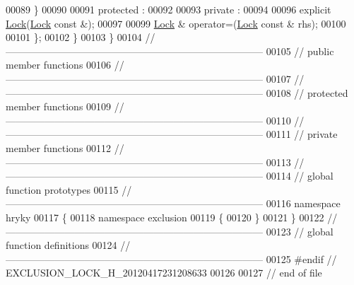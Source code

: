 \begin{DoxyCode}
00089     \}
00090 
00091 \textcolor{keyword}{protected} :
00092 
00093 \textcolor{keyword}{private} :
00094 
00096     \textcolor{keyword}{explicit} \hyperlink{classhryky_1_1exclusion_1_1_lock_a742be489a570c6005ea504e815433a97}{Lock}(\hyperlink{classhryky_1_1exclusion_1_1_lock}{Lock} \textcolor{keyword}{const} &);
00097 
00099     \hyperlink{classhryky_1_1exclusion_1_1_lock}{Lock} & operator=(\hyperlink{classhryky_1_1exclusion_1_1_lock}{Lock} \textcolor{keyword}{const} & rhs);
00100 
00101 \};
00102 \}
00103 \}
00104 \textcolor{comment}{//
      ------------------------------------------------------------------------------}
00105 \textcolor{comment}{// public member functions}
00106 \textcolor{comment}{//
      ------------------------------------------------------------------------------}
00107 \textcolor{comment}{//
      ------------------------------------------------------------------------------}
00108 \textcolor{comment}{// protected member functions}
00109 \textcolor{comment}{//
      ------------------------------------------------------------------------------}
00110 \textcolor{comment}{//
      ------------------------------------------------------------------------------}
00111 \textcolor{comment}{// private member functions}
00112 \textcolor{comment}{//
      ------------------------------------------------------------------------------}
00113 \textcolor{comment}{//
      ------------------------------------------------------------------------------}
00114 \textcolor{comment}{// global function prototypes}
00115 \textcolor{comment}{//
      ------------------------------------------------------------------------------}
00116 \textcolor{keyword}{namespace }hryky
00117 \{
00118 \textcolor{keyword}{namespace }exclusion
00119 \{
00120 \}
00121 \}
00122 \textcolor{comment}{//
      ------------------------------------------------------------------------------}
00123 \textcolor{comment}{// global function definitions}
00124 \textcolor{comment}{//
      ------------------------------------------------------------------------------}
00125 \textcolor{preprocessor}{#endif // EXCLUSION\_LOCK\_H\_20120417231208633}
00126 \textcolor{preprocessor}{}
00127 \textcolor{comment}{// end of file}
\end{DoxyCode}
